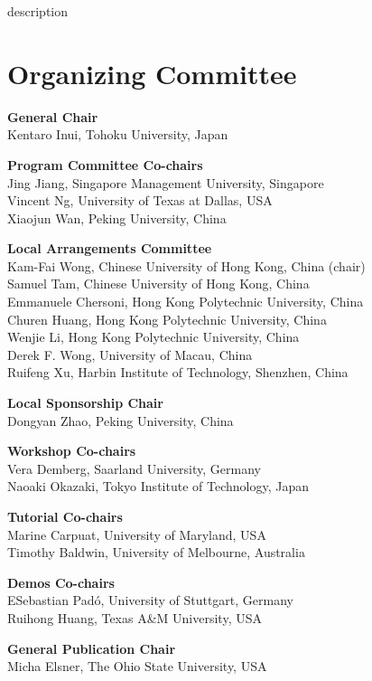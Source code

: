 description\markboth{}{} %
\markright{}{} %

\section{Organizing Committee}

\setlength{\parindent}{0pt}

{\bf General Chair} \\
Kentaro Inui, Tohoku University, Japan       


{\bf Program Committee Co-chairs} \\
Jing Jiang, Singapore Management University, Singapore \\
Vincent Ng, University of Texas at Dallas, USA \\
Xiaojun Wan, Peking University, China

{\bf Local Arrangements Committee} \\
Kam-Fai Wong, Chinese University of Hong Kong, China (chair) \\
Samuel Tam, Chinese University of Hong Kong, China \\
Emmanuele Chersoni, Hong Kong Polytechnic University, China \\
Churen Huang, Hong Kong Polytechnic University, China \\
Wenjie Li, Hong Kong Polytechnic University, China \\
Derek F. Wong, University of Macau, China \\
Ruifeng Xu, Harbin Institute of Technology, Shenzhen, China

{\bf Local Sponsorship Chair} \\
Dongyan Zhao, Peking University, China
        

{\bf Workshop Co-chairs} \\
Vera Demberg, Saarland University, Germany \\
Naoaki Okazaki, Tokyo Institute of Technology, Japan


{\bf Tutorial Co-chairs} \\
Marine Carpuat, University of Maryland, USA \\
Timothy Baldwin, University of Melbourne, Australia

{\bf Demos Co-chairs} \\
ESebastian Pad\'o, University of Stuttgart, Germany \\
Ruihong Huang, Texas A\&M University, USA
 

{\bf General Publication Chair} \\
Micha Elsner, The Ohio State University, USA


